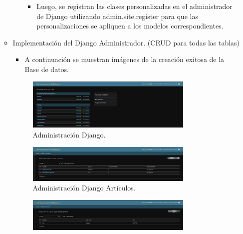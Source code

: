 \documentclass{article}
\begin{document}
\begin{itemize}
\begin{itemize}
\begin{itemize}
\begin{itemize}
                    \item Luego, se registran las clases personalizadas en el administrador de Django utilizando admin.site.register para que las personalizaciones se apliquen a los modelos correspondientes.
                \end{itemize}
            \end{itemize}
            

            \item Implementación del Django Administrador. (CRUD para todas las tablas)
            \begin{itemize}
                \item A continuación se muestran imágenes de la creación exitosa de la Base de datos.
            \end{itemize}
            \begin{figure}[H]
		      \centering
                \includegraphics[width=0.8\textwidth,keepaspectratio]{img/V11.jpeg}
		      \caption{Administración Django.}
	   \end{figure}
            \begin{figure}[H]
		      \centering
                \includegraphics[width=0.8\textwidth,keepaspectratio]{img/V12.jpeg}
		      \caption{Administración Django Artículos.}
	   \end{figure}
            \begin{figure}[H]
		      \centering
                \includegraphics[width=0.8\textwidth,keepaspectratio]{img/V13.jpeg}

\end{figure}
\end{itemize}
\end{itemize}
\end{document}
